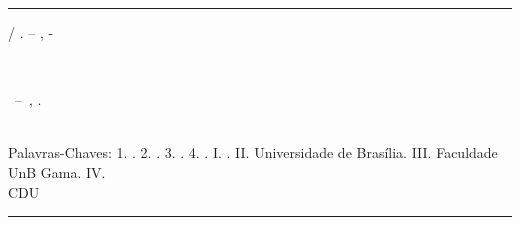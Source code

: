 \begin{fichacatalografica}
	\vspace*{\fill}					%
	\hrule							%
	\begin{center}					%
	\begin{minipage}[c]{12.5cm}		%

	\imprimirautor

	\hspace{0.5cm} \imprimirtitulo  / \imprimirautor. --
	\imprimirlocal, \imprimirdata-

	\hspace{0.5cm} \imprimirorientadorRotulo~\imprimirorientador\\

	\hspace{0.5cm}
	\parbox[t]{\textwidth}{\imprimirtipotrabalho~--~\imprimirinstituicao,
	\imprimirdata.}\\

	\hspace{0.5cm}
		Palavras-Chaves:
		1. \imprimirpalavrachaveum.
		2. \imprimirpalavrachavedois.
		3. \imprimirpalavrachavetres.
		4. \imprimirpalavrachavequatro.
		I. \imprimirorientador.
		II. Universidade de Brasília.
		III. Faculdade UnB Gama.
		IV. \imprimirtitulo\\

	\hspace{8.75cm} CDU \nomecdu\\

	\end{minipage}
	\end{center}
	\hrule
\end{fichacatalografica}
